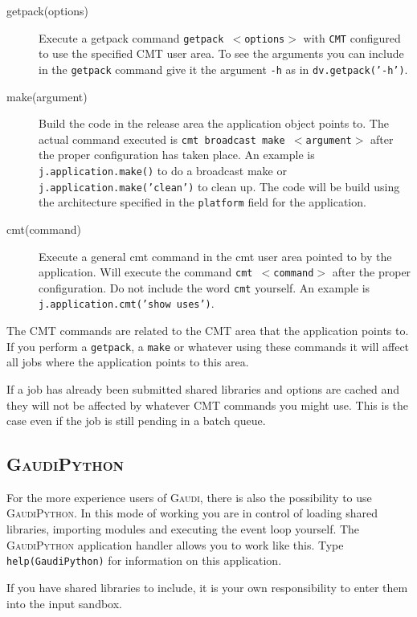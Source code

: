 \documentclass{howto}
\def\gaudi {\textsc{Gaudi}\xspace}
\def\gaudipython {\textsc{GaudiPython}\xspace}
\begin{document}
\begin{description}
\item[getpack(options)] Execute a getpack command \texttt{getpack
    $<$options$>$} with \texttt{CMT} configured to use the specified CMT user
  area. To see the arguments you can include in the \texttt{getpack} command
  give it the argument \texttt{-h} as in \texttt{dv.getpack('-h')}.
\item[make(argument)] Build the code in the release area the application
  object points to. The actual command executed is \texttt{cmt broadcast make
    $<$argument$>$} after the proper configuration has taken place. An example
  is \texttt{j.application.make()} to do a broadcast make or
  \texttt{j.application.make('clean')} to clean up. The code will be build
  using the architecture specified in the \texttt{platform} field for the
  application.
\item[cmt(command)] Execute a general cmt command in the cmt user area pointed
  to by the application. Will execute the command \texttt{cmt $<$command$>$}
  after the proper configuration. Do not include the word \texttt{cmt}
  yourself. An example is \texttt{j.application.cmt('show uses')}.
\end{description}

The CMT commands are related to the CMT area that the application points to.
If you perform a \texttt{getpack}, a \texttt{make} or whatever using these
commands it will affect all jobs where the application points to this area.

\begin{notice}
  If a job has already been submitted shared libraries and options are cached
  and they will not be affected by whatever CMT commands you might use. This
  is the case even if the job is still pending in a batch queue.
\end{notice}

\subsection{\gaudipython}
For the more experience users of \gaudi, there is also the possibility to use
\gaudipython. In this mode of working you are in control of loading shared
libraries, importing modules and executing the event loop yourself. The
\gaudipython application handler allows you to work like this. 
Type \texttt{help(GaudiPython)} for information on this application.

\begin{notice}
If you have shared libraries to include, it is your own responsibility to
enter them into the input sandbox.
\end{notice}
\end{document}
